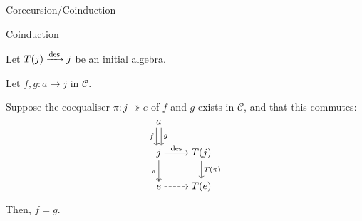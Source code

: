 \begin{frame}{Corecursion/Coinduction} %

  \par {}

  \pause
  
  \begin{block}{Coinduction}
    
    \par Let $T(j) \xrightarrow{\operatorname{des}} j$ be an initial algebra.
    \par Let $f, g : a \to j$ in $\mathcal{C}$.
    \par Suppose the coequaliser $\pi : j \twoheadrightarrow e$ of $f$ and $g$ exists in $\mathcal{C}$, and that this commutes:
    \vspace{-0.5 \baselineskip}
    \begin{align*}
      \begin{tikzcd}[cramped, ampersand replacement = \;]
          a
            \arrow[d, "f"', shift right]
            \arrow[d, "g", shift left]
          \;
        \\
          j
            \arrow[r, "\des"]
            \arrow[d, "\pi"', two heads]
          \;
          T(j)
            \arrow[d, "T(\pi)"]
        \\
          e
            \arrow[r, dashed]
          \;
          T(e)
      \end{tikzcd}
    \end{align*}
    \par Then, $f = g$.

  \end{block}

\end{frame}
